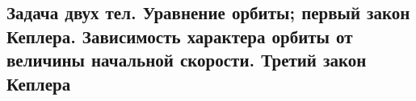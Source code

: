 

\subsection{Задача двух тел. Уравнение орбиты; первый закон Кеплера. Зависимость характера орбиты от величины начальной скорости. Третий закон Кеплера}



